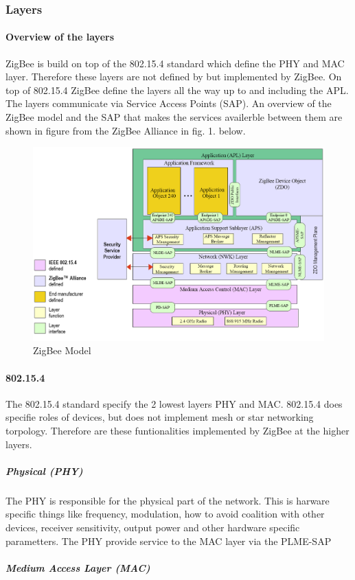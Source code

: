 \documentclass[a4paper,12pt,english]{article}
\begin{document}
\subsubsection{Layers}
\paragraph{Overview of the layers}
ZigBee is build on top of the 802.15.4 standard which define the PHY and MAC
layer. Therefore these layers are not defined by but implemented by
ZigBee.
On top of 802.15.4 ZigBee define the layers all the way up to and including
the APL. The layers communicate via Service Access Points
(SAP). An overview of the ZigBee
model and the SAP that makes the services availerble between
them are shown in figure from the ZigBee Alliance in fig. 1. below.
\begin{figure}[h]
\includegraphics[width=\textwidth]{zigbeeLayers.png}
\caption{ZigBee Model\cite{zigbeeModel}}
\end{figure}

\paragraph{802.15.4}
The 802.15.4 standard specify the 2 lowest layers PHY and MAC. 802.15.4 does
specifie roles of devices, but does not implement mesh or star networking
torpology. Therefore are these funtionalities implemented by ZigBee at the
higher layers. 
\subparagraph{Physical (PHY)}
The PHY is responsible for the physical part of the network. This is
harware specific things like frequency, modulation, how to avoid coalition
with other devices, receiver sensitivity, output power and other hardware
specific parametters. The PHY provide service to the MAC layer via the
PLME-SAP 
\subparagraph{Medium Access Layer (MAC)}
\end{document}
